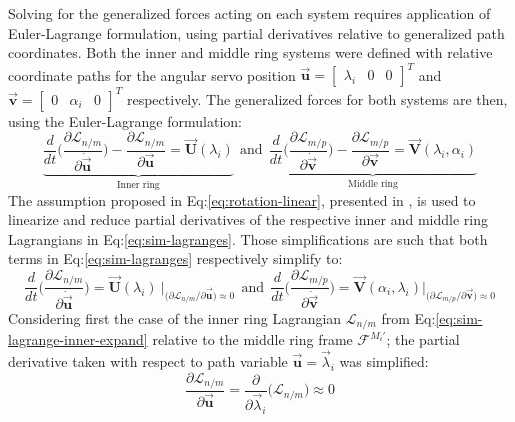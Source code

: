 Solving for the generalized forces acting on each system requires application of Euler-Lagrange formulation, using partial derivatives relative to generalized path coordinates. Both the inner and middle ring systems were defined with relative coordinate paths for the angular servo position $\vec{\mathbf{u}}=\begin{bmatrix}\lambda_i&0&0\end{bmatrix}^T$ and $\vec{\mathbf{v}}=\begin{bmatrix}0&\alpha_i&0\end{bmatrix}^T$ respectively. The generalized forces for both systems are then, using the Euler-Lagrange formulation:
\begin{equation}\label{eq:sim-lagranges}
\underbrace{\frac{d}{dt}\bigg(\frac{\partial\mathcal{L}_{n/m}}{\partial\dot{\vec{\mathbf{u}}}}\bigg)-\frac{\partial\mathcal{L}_{n/m}}{\partial\vec{\mathbf{u}}}=\vec{\mathbf{U}}(\lambda_i)}_{\text{Inner ring}}~~\text{and}~~\underbrace{\frac{d}{dt}\bigg(\frac{\partial\mathcal{L}_{m/p}}{\partial\dot{\vec{\mathbf{v}}}}\bigg)-\frac{\partial\mathcal{L}_{m/p}}{\partial\vec{\mathbf{v}}}=\vec{\mathbf{V}}(\lambda_i,\alpha_i)}_{\text{Middle ring}}
\end{equation}
The assumption proposed in Eq:\ref{eq:rotation-linear}, presented in \cite{rotationlinearize}, is used to linearize and reduce partial derivatives of the respective inner and middle ring Lagrangians in Eq:\ref{eq:sim-lagranges}. Those simplifications are such that both terms in Eq:\ref{eq:sim-lagranges} respectively simplify to:
\begin{equation}\label{eq:sim-lagranges-linear}
\frac{d}{dt}\bigg(\frac{\partial\mathcal{L}_{n/m}}{\partial\dot{\vec{\mathbf{u}}}}\bigg)=\vec{\mathbf{U}}(\lambda_i)~\Big|_{\big(\partial\mathcal{L}_{n/m}/\partial\vec{\mathbf{u}}\big)\approx 0}~~\text{and}~~\frac{d}{dt}\bigg(\frac{\partial\mathcal{L}_{m/p}}{\partial\dot{\vec{\mathbf{v}}}}\bigg)=\vec{\mathbf{V}}(\alpha_i,\lambda_i)\Big|_{\big(\partial\mathcal{L}_{m/p}/\partial\vec{\mathbf{v}}\big)\approx 0}
\end{equation}
Considering first the case of the inner ring Lagrangian $\mathcal{L}_{n/m}$ from Eq:\ref{eq:sim-lagrange-inner-expand} relative to the middle ring frame $\mathcal{F}^{M_i'}$; the partial derivative taken with respect to path variable $\vec{\mathbf{u}}=\vec{\lambda}_i$ was simplified:
\begin{equation}\label{eq:sim-lagrange-inner-simple}
\frac{\partial\mathcal{L}_{n/m}}{\partial\vec{\mathbf{u}}}=\frac{\partial}{\partial\vec{\lambda}_i}\big(\mathcal{L}_{n/m}\big)\approx 0
\end{equation}
